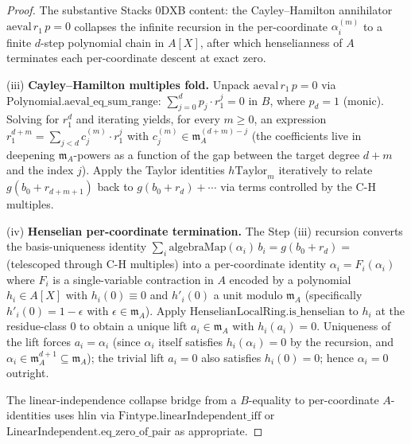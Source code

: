 \begin{proof}

\leanok
The substantive Stacks 0DXB content: the Cayley--Hamilton
annihilator $\mathrm{aeval}\,r_1\,p = 0$ collapses the infinite
recursion in the per-coordinate $\alpha^{(m)}_i$ to a finite
$d$-step polynomial chain in $A[X]$, after which henselianness of
$A$ terminates each per-coordinate descent at exact zero.

(iii) \textbf{Cayley--Hamilton multiples fold.} Unpack
$\mathrm{aeval}\,r_1\,p = 0$ via
$\mathrm{Polynomial.aeval\_eq\_sum\_range}$:
$\sum_{j=0}^{d} p_j \cdot r_1^j = 0$ in $B$, where
$p_d = 1$ (monic). Solving for $r_1^d$ and iterating yields, for
every $m \ge 0$, an expression
$r_1^{d+m} = \sum_{j < d} c^{(m)}_j \cdot r_1^j$ with
$c^{(m)}_j \in \mathfrak m_A^{(d+m) - j}$ (the coefficients live in
deepening $\mathfrak m_A$-powers as a function of the gap between
the target degree $d + m$ and the index $j$). Apply the Taylor
identities $h\mathrm{Taylor}_m$ iteratively to relate
$g(b_0 + r_{d+m+1})$ back to $g(b_0 + r_d) + \cdots$ via terms
controlled by the C-H multiples.

(iv) \textbf{Henselian per-coordinate termination.} The Step (iii)
recursion converts the basis-uniqueness identity
$\sum_i \mathrm{algebraMap}(\alpha_i)\,b_i =
 g(b_0 + r_d) = $ (telescoped through C-H multiples) into a
per-coordinate identity $\alpha_i = F_i(\alpha_i)$ where $F_i$ is
a single-variable contraction in $A$ encoded by a polynomial
$h_i \in A[X]$ with $h_i(0) \equiv 0$ and $h'_i(0)$ a unit modulo
$\mathfrak m_A$ (specifically $h'_i(0) = 1 - \epsilon$ with
$\epsilon \in \mathfrak m_A$). Apply
$\mathrm{HenselianLocalRing.is\_henselian}$ to $h_i$ at the
residue-class $0$ to obtain a unique lift $a_i \in \mathfrak m_A$
with $h_i(a_i) = 0$. Uniqueness of the lift forces $a_i =
\alpha_i$ (since $\alpha_i$ itself satisfies $h_i(\alpha_i) = 0$
by the recursion, and $\alpha_i \in \mathfrak m_A^{d+1}
\subseteq \mathfrak m_A$); the trivial lift $a_i = 0$ also
satisfies $h_i(0) = 0$; hence $\alpha_i = 0$ outright.

The linear-independence collapse bridge from a $B$-equality to
per-coordinate $A$-identities uses $\mathrm{hlin}$ via
$\mathrm{Fintype.linearIndependent\_iff}$ or
$\mathrm{LinearIndependent.eq\_zero\_of\_pair}$ as appropriate.


\end{proof}
